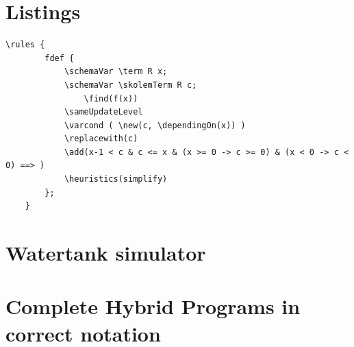 \section{Listings}
\label{app:sec:listings}

\begin{lstlisting}[label=app:lst:ruleF]
	\rules {
 	 	fdef {
			\schemaVar \term R x;
			\schemaVar \skolemTerm R c;
    			\find(f(x))
			\sameUpdateLevel
			\varcond ( \new(c, \dependingOn(x)) )
			\replacewith(c)
			\add(x-1 < c & c <= x & (x >= 0 -> c >= 0) & (x < 0 -> c < 0) ==> )
			\heuristics(simplify)
		};
	}	
\end{lstlisting}

\section{Watertank simulator}
\label{app:sec:simulator}

\section{Complete Hybrid Programs in correct notation}
\label{app:sec:pdfs}





